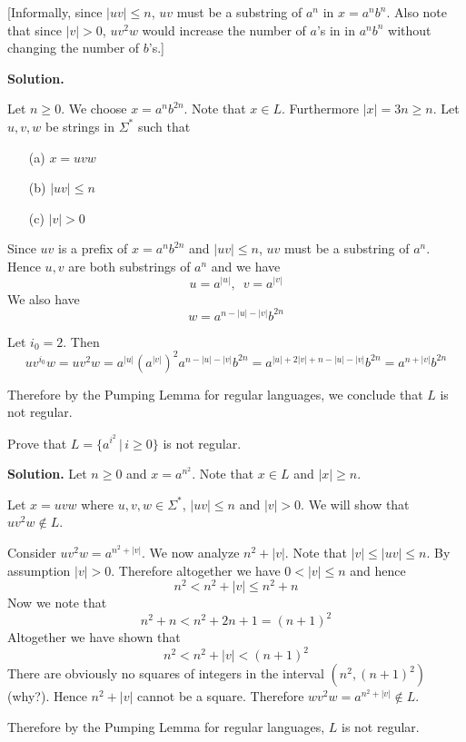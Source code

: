 [Informally,
since $|uv| \leq n$, $uv$ must be a substring of $a^n$ in $x = a^nb^n$.
Also note that since $|v| > 0$, $uv^2w$ would increase
the number of $a$'s in in $a^nb^n$ without changing the number of
$b$'s.]




\textbf{Solution.}

Let $n \geq 0$.
We choose $x = a^n b^{2n}$. Note that $x \in L$.
Furthermore $|x| = 3n \geq n$.
Let $u,v,w$ be strings in $\Sigma^*$ such that
\begin{enumerate}[label=\textnormal{(\alph*)},itemsep=0pt,nosep,noitemsep,partopsep=0pt,topsep=0pt,parsep=0pt]
 \item[(a)] $x = uvw$
 \item[(b)] $|uv| \leq n$
 \item[(c)] $|v| > 0$
\end{enumerate}
 
Since $uv$ is a prefix of $x = a^n b^{2n}$
and $|uv| \leq n$, $uv$ must be a substring of $a^n$.
Hence $u,v$ are both substrings of $a^n$ and we have
\[
u = a^{|u|}, \,\,\, 
v = a^{|v|}
\]
We also have
\[
w = a^{n - |u| - |v|} b^{2n}
\]

Let $i_0 = 2$. Then
\[
uv^{i_0}w
= uv^2w 
= a^{|u|} (a^{|v|})^2 a^{n - |u| - |v|} b^{2n}
= a^{|u| + 2|v| + n - |u| - |v|} b^{2n}
= a^{n + |v|} b^{2n}
\]

Therefore by the Pumping Lemma for regular languages, we 
conclude that $L$ is not regular.












\vspace{0.1in}



\newpage
\begin{eg}
Prove that $L = \{a^{i^2} \,|\, i \geq 0\}$ is not regular.

\textbf{Solution.} Let $n \geq 0$ and $x = a^{n^2}$. Note that $x \in
L$ and $|x| \geq n$.

Let $x = uvw$ where $u,v,w \in \Sigma^*$, $|uv| \leq n$ and $|v|>0$. We
will show that $uv^2w \notin L$.

Consider $uv^2w = a^{n^2+|v|}$. We now analyze $n^2+|v|$. Note
that $|v| \leq |uv|\leq n$. By assumption $|v|>0$. Therefore
altogether we have $0 < |v| \leq n$ and hence
\[
 n^2 < n^2 + |v| \leq n^2 + n
\]
Now we note that
\[
 n^2 + n < n^2 + 2n + 1 = (n+1)^2
\]
Altogether we have shown that
\[
 n^2 < n^2+|v| < (n+1)^2
\]
There are obviously no squares of integers in the interval
$(n^2,(n+1)^2)$ (why?). Hence $n^2+|v|$ cannot be a square.
Therefore $wv^2w = a^{n^2+|v|} \notin L$.

Therefore by the Pumping Lemma for regular languages, $L$ is not
regular.
\\
\end{eg}


